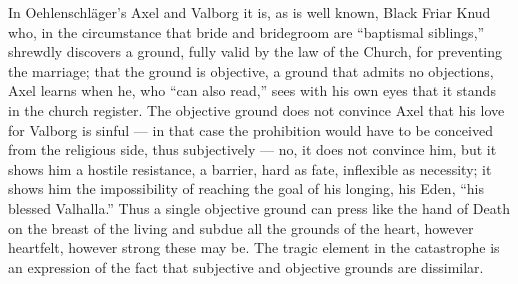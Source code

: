 \documentclass[12pt,a4paper,openany]{book}
\newcommand{\opage}[1]{\marginnote{\footnotesize\textit{[#1]}}}
\begin{document}
In Oehlenschläger's Axel and Valborg it is, as
is well known, Black Friar Knud who, in the circumstance
\setcounter{footnote}{0}%
\opage{586}that bride and bridegroom are ``baptismal siblings,'' shrewdly
discovers a ground, fully valid by the law of the Church, for
preventing the marriage; that the ground is objective, a ground
that admits no objections, Axel learns when
he, who ``can also read,'' sees with his own eyes that it
stands in the church register. The objective ground does not convince
Axel that his love for Valborg is sinful
--- in that case the prohibition would have to be conceived from the
religious side, thus subjectively --- no, it does not convince him,
but it shows him a hostile resistance, a barrier,
hard as fate, inflexible as necessity; it
shows him the impossibility of reaching the goal of his longing, his
Eden, ``his blessed Valhalla.'' Thus a single objective
ground can press like the hand of Death on the breast of the living
and subdue all the grounds of the heart, however
heartfelt, however strong these may be.
The tragic element in the catastrophe is an expression of the fact that subjective and objective
grounds are dissimilar.
\end{document}
